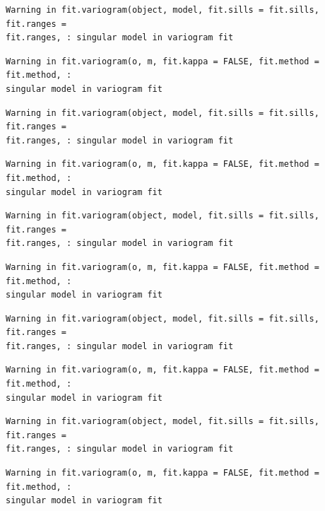 \documentclass[
  letterpaper,
  DIV=11,
  numbers=noendperiod]{scrartcl}
\begin{document}
\begin{verbatim}
Warning in fit.variogram(object, model, fit.sills = fit.sills, fit.ranges =
fit.ranges, : singular model in variogram fit
\end{verbatim}

\begin{verbatim}
Warning in fit.variogram(o, m, fit.kappa = FALSE, fit.method = fit.method, :
singular model in variogram fit
\end{verbatim}

\begin{verbatim}
Warning in fit.variogram(object, model, fit.sills = fit.sills, fit.ranges =
fit.ranges, : singular model in variogram fit
\end{verbatim}

\begin{verbatim}
Warning in fit.variogram(o, m, fit.kappa = FALSE, fit.method = fit.method, :
singular model in variogram fit
\end{verbatim}

\begin{verbatim}
Warning in fit.variogram(object, model, fit.sills = fit.sills, fit.ranges =
fit.ranges, : singular model in variogram fit
\end{verbatim}

\begin{verbatim}
Warning in fit.variogram(o, m, fit.kappa = FALSE, fit.method = fit.method, :
singular model in variogram fit
\end{verbatim}

\begin{verbatim}
Warning in fit.variogram(object, model, fit.sills = fit.sills, fit.ranges =
fit.ranges, : singular model in variogram fit
\end{verbatim}

\begin{verbatim}
Warning in fit.variogram(o, m, fit.kappa = FALSE, fit.method = fit.method, :
singular model in variogram fit
\end{verbatim}

\begin{verbatim}
Warning in fit.variogram(object, model, fit.sills = fit.sills, fit.ranges =
fit.ranges, : singular model in variogram fit
\end{verbatim}

\begin{verbatim}
Warning in fit.variogram(o, m, fit.kappa = FALSE, fit.method = fit.method, :
singular model in variogram fit
\end{verbatim}
\end{document}
